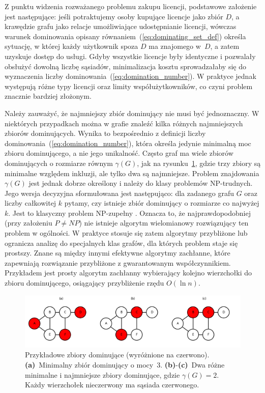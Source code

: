 Z punktu widzenia rozważanego problemu zakupu licencji, podstawowe założenie jest następujące:
jeśli potraktujemy osoby kupujące licencje jako zbiór \(D\), a krawędzie grafu jako relacje
umożliwiające udostępnianie licencji, wówczas warunek dominowania opisany równaniem~(\ref{eq:dominating_set_def}) określa sytuację,
w której każdy użytkownik spoza $D$ ma znajomego w~$D$, a zatem uzyskuje dostęp do usługi.
Gdyby wszystkie licencje były identyczne i pozwalały obsłużyć dowolną liczbę sąsiadów,
minimalizacja kosztu sprowadzałaby się do wyznaczenia liczby dominowania~(\ref{eq:domination_number}).
W praktyce jednak występują różne typy licencji oraz limity
współużytkowników, co czyni problem znacznie bardziej złożonym.

Należy zauważyć, że najmniejszy zbiór dominujący nie musi być jednoznaczny.
W niektórych przypadkach można w grafie znaleźć kilka różnych najmniejszych zbiorów dominujących.
Wynika to bezpośrednio z definicji liczby dominowania~(\ref{eq:domination_number}),
która określa jedynie minimalną moc zbioru dominującego, a nie jego unikalność.
Często graf ma wiele zbiorów dominujących o rozmiarze równym $\gamma(G)$,
jak na rysunku~\ref{fig:dominatingexample}, gdzie trzy zbiory są minimalne względem inkluzji, ale tylko dwa są najmniejsze.
Problem znajdowania $\gamma(G)$ jest jednak dobrze określony i należy do klasy problemów NP-trudnych. Jego wersja decyzyjna sformułowana jest następująco: dla zadanego grafu $G$ oraz liczby całkowitej $k$ pytamy, czy istnieje zbiór dominujący o rozmiarze co najwyżej $k$. Jest to klasyczny problem NP-zupełny \cite{POUREIDI2023106363, PANDA2023337}. Oznacza to, że najprawdopodobniej (przy założeniu $P \neq NP$) nie istnieje algorytm wielomianowy rozwiązujący ten problem w ogólności. W praktyce stosuje się zatem algorytmy przybliżone lub ogranicza analizę do specjalnych klas grafów, dla których problem staje się prostszy. Znane są między innymi efektywne algorytmy zachłanne, które zapewniają rozwiązanie przybliżone z gwarantowanym współczynnikiem. Przykładem jest prosty algorytm zachłanny wybierający kolejno wierzchołki do zbioru dominującego, osiągający przybliżenie rzędu $O(\ln n)$.


\begin{figure}[H]
  \centering
  \includegraphics[width=1\textwidth]{assets/dominating-set-example.png}
  \caption[Przykładowe zbiory dominujące]{%
    Przykładowe zbiory dominujące (wyróżnione na czerwono).
    \textbf{(a)}~Minimalny zbiór dominujący o mocy~3.
    \textbf{(b)}-\textbf{(c)}~Dwa różne minimalne i najmniejsze zbiory dominujące, gdzie
    \(\gamma(G)=2\).  Każdy wierzchołek nieczerwony ma sąsiada czerwonego.
  }
  \label{fig:dominatingexample}
\end{figure}


